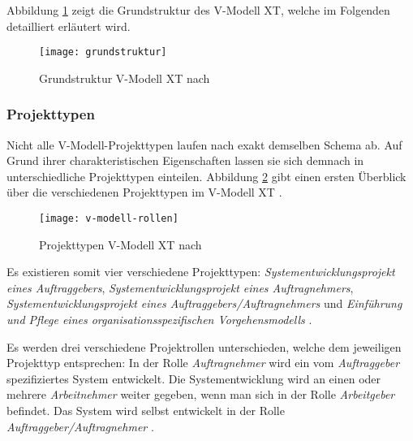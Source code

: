 Abbildung \ref{fig:grundstruktur} zeigt die Grundstruktur des V-Modell XT, welche im Folgenden detailliert erläutert wird.
\begin{figure}[htp]
\begin{center}
  \texttt{[image: grundstruktur]} %
  \caption{Grundstruktur V-Modell XT nach \cite{2004vmodell}}
  \label{fig:grundstruktur}
\end{center}
\end{figure}

\subsubsection{Projekttypen}
Nicht alle V-Modell-Projekttypen laufen nach exakt demselben Schema ab. Auf Grund ihrer charakteristischen Eigenschaften lassen sie sich demnach in unterschiedliche Projekttypen einteilen. Abbildung \ref{fig:Projekttypen} gibt einen ersten Überblick über die verschiedenen Projekttypen im V-Modell XT \cite{2004vmodell}.

\begin{figure}[htp]
\begin{center}
  \texttt{[image: v-modell-rollen]} %
  \caption{Projekttypen V-Modell XT nach \cite{2004vmodell}}
  \label{fig:Projekttypen}
\end{center}
\end{figure}

Es existieren somit vier verschiedene Projekttypen: \textit{Systementwicklungsprojekt eines Auftraggebers}, \textit{Systementwicklungsprojekt eines Auftragnehmers},  \textit{Systementwicklungsprojekt eines Auftraggebers/Auftragnehmers}  und \textit{Einführung und Pflege eines organisationsspezifischen Vorgehensmodells} \cite{reinhard2008}. \newline

Es werden drei verschiedene Projektrollen unterschieden, welche dem jeweiligen Projekttyp entsprechen: In der Rolle \textit{Auftragnehmer} wird ein vom \textit{Auftraggeber} spezifiziertes System entwickelt. Die Systementwicklung wird an einen oder mehrere \textit{Arbeitnehmer} weiter gegeben, wenn man sich in der Rolle \textit{Arbeitgeber} befindet. Das System  wird selbst entwickelt in der Rolle \textit{Auftraggeber/Auftragnehmer} \cite{brack2010,2004vmodell}.\newline


